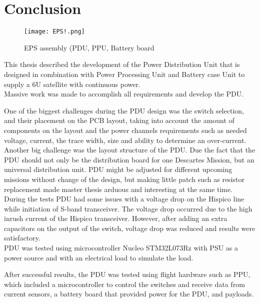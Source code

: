 \chapter{Conclusion\label{cha:chapter7}}

 \begin{figure}[h]
 	\centering
 	\texttt{[image: EPS!.png]}
 	\caption{EPS assembly (PDU, PPU, Battery board}
 	\label{fig: EPS!}
 \end{figure}

This thesis described the development of the Power Distribution Unit that is designed in combination with Power Processing Unit and Battery case Unit to supply a 6U satellite with  continuous power.\\  


Massive work was made to accomplish all requirements and develop the PDU.

 One of the biggest challenges during the PDU design was the switch selection, and their placement on the PCB layout, taking into account the amount of components on the layout and the power channels requirements such as needed voltage, current, the trace width, size and ability to determine an over-current. Another big challenge was the layout structure of the PDU. Due the fact that the PDU should not only be the distribution board for one Descartes Mission, but an universal distribution unit. PDU might be adjusted for different upcoming missions without change of the design, but making little patch such as resistor replacement made master thesis arduous and interesting at the same time. During the tests PDU had some issues with a voltage drop on the Hispico line while initiation of S-band transceiver. The voltage drop occurred due to the high inrush current of the Hispico transceiver.    However, after adding an extra capacitors on the output of the switch, voltage drop was reduced and results were satisfactory.    \\

PDU was tested using microcontroller Nucleo STM32L073Rz with PSU as a power source and with an electrical load to simulate the load. 

After successful results, the PDU was tested using flight hardware such as PPU, which included a microcontroller to control the switches and receive data from current sensors, a battery board that provided power for the PDU, and payloads. 

